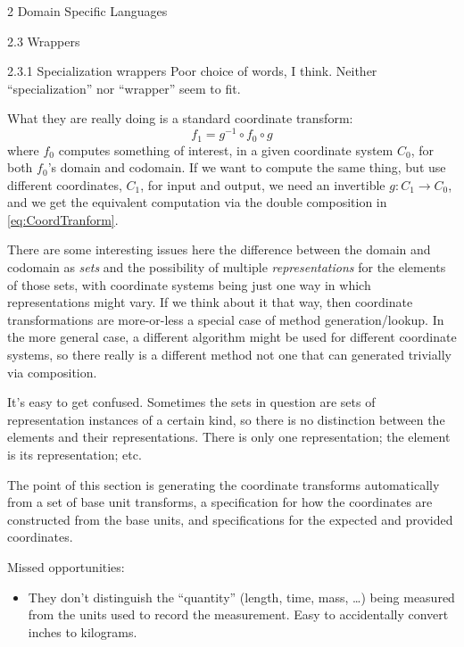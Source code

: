 \documentclass[12pt]{PalisadesLakesBook}
\begin{document}
\begin{plSection}{2 Domain Specific Languages}
\begin{plSection}{2.3 Wrappers}
\begin{plSection}{2.3.1 Specialization wrappers}
Poor choice of words, I think.
Neither ``specialization'' nor ``wrapper'' seem to fit.

What they are really doing is a standard coordinate transform:
\begin{equation}\label{eq:CoordTranform}
f_{1} = g^{-1} \circ f_{0} \circ g
\end{equation}
where $f_{0}$ computes something of interest,
in a given coordinate system $C_{0}$,
for both $f_{0}$'s domain and codomain.
If we want to compute the same thing,
but use different coordinates, $C_{1}$, for input and output,
we need an invertible $g : C_{1} \rightarrow C_{0}$,
and we get the equivalent computation via the double
composition in \cref{eq:CoordTranform}.

There are some interesting issues here the difference between
the domain and codomain as \emph{sets}
and the possibility of multiple \emph{representations}
for the elements of those sets, 
with coordinate systems being just one way
in which representations might vary.
If we think about it that way,
then coordinate transformations are more-or-less a special case
of method generation/lookup.
In the more general case, a different algorithm might be
used for different coordinate systems,
so there really is a different method
not one that can generated trivially via composition.

It's easy to get confused. 
Sometimes the sets in question
are sets of representation instances of a certain kind,
so there is no distinction between the elements 
and their representations.
There is only one representation; 
the element is its representation; etc.

The point of this section is generating the coordinate transforms
automatically from a set of base unit transforms,
a specification for how the coordinates are constructed
from the base units,
and specifications for the expected and provided coordinates.

Missed opportunities: 
\begin{itemize}
  \item They don't distinguish the ``quantity''
  ({\pseudocodeFont length}, {\pseudocodeFont time}, 
  {\pseudocodeFont mass}, {\ldots}) being measured
  from the units used to record the measurement.
  Easy to accidentally convert inches to kilograms.


\end{itemize}
\end{plSection}
\end{plSection}
\end{plSection}
\end{document}
